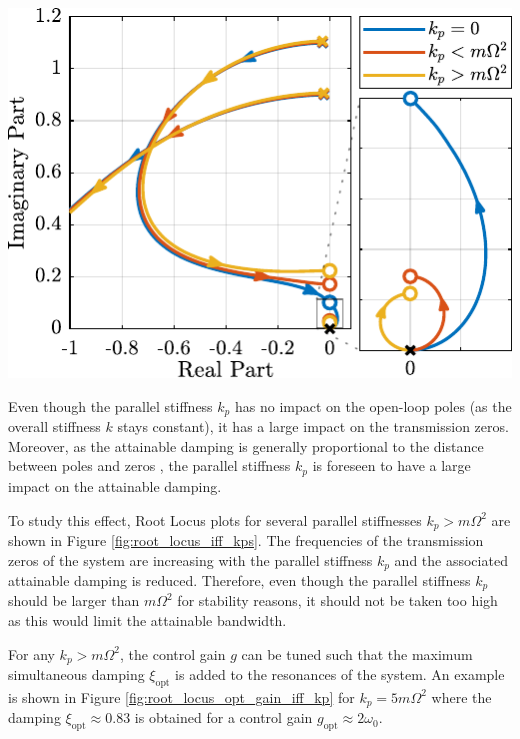 \documentclass{ISMA_USD2020}
\begin{document}
\begin{minipage}[b]{0.52\linewidth}
\begin{center}
\includegraphics[scale=1]{figs/root_locus_iff_kp.pdf}
\end{center}
\end{minipage}

\par
Even though the parallel stiffness \(k_p\) has no impact on the open-loop poles (as the overall stiffness \(k\) stays constant), it has a large impact on the transmission zeros.
Moreover, as the attainable damping is generally proportional to the distance between poles and zeros \cite{preumont18_vibrat_contr_activ_struc_fourt_edition}, the parallel stiffness \(k_p\) is foreseen to have a large impact on the attainable damping.

To study this effect, Root Locus plots for several parallel stiffnesses \(k_p > m \Omega^2\) are shown in Figure \ref{fig:root_locus_iff_kps}.
The frequencies of the transmission zeros of the system are increasing with the parallel stiffness \(k_p\) and the associated attainable damping is reduced.
Therefore, even though the parallel stiffness \(k_p\) should be larger than \(m \Omega^2\) for stability reasons, it should not be taken too high as this would limit the attainable bandwidth.

For any \(k_p > m \Omega^2\), the control gain \(g\) can be tuned such that the maximum simultaneous damping \(\xi_\text{opt}\) is added to the resonances of the system.
An example is shown in Figure \ref{fig:root_locus_opt_gain_iff_kp} for \(k_p = 5 m \Omega^2\) where the damping \(\xi_{\text{opt}} \approx 0.83\) is obtained for a control gain \(g_\text{opt} \approx 2 \omega_0\).
\end{document}
